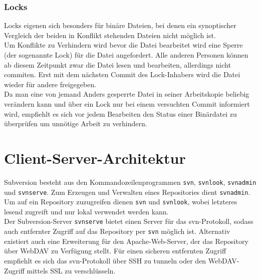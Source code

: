 \subsubsection{Locks}
Locks eigenen sich besonders für binäre Dateien, bei denen ein synoptischer Vergleich der beiden in Konflikt stehenden Dateien nicht möglich ist.\\
Um Konflikte zu Verhindern wird bevor die Datei bearbeitet wird eine Sperre (der sogenannte Lock) für die Datei angefordert. Alle anderen Personen können ab diesem Zeitpunkt zwar die Datei lesen und bearbeiten, allerdings nicht commiten. Erst mit dem nächsten Commit des Lock-Inhabers wird die Datei wieder für andere freigegeben.\\
Da man eine von jemand Anders gesperrte Datei in seiner Arbeitskopie beliebig verändern kann und über ein Lock nur bei einem versuchten Commit informiert wird, empfiehlt es sich vor jedem Bearbeiten den Status einer Binärdatei zu überprüfen um unnötige Arbeit zu verhindern.

\section{Client-Server-Architektur}
Subversion besteht aus den Kommandozeilenprogrammen \texttt{svn}, \texttt{svnlook}, \texttt{svnadmin} und \texttt{svnserve}. Zum Erzeugen und Verwalten eines Repositories dient \texttt{svnadmin}. Um auf ein Repository zuzugreifen dienen \texttt{svn} und \texttt{svnlook}, wobei letzteres lesend zugreift und nur lokal verwendet werden kann.\\
Der Subversion-Server \texttt{svnserve} bietet einen Server für das svn-Protokoll, sodass auch entfernter Zugriff auf das Repository per \texttt{svn} möglich ist. Alternativ existiert auch eine Erweiterung für den Apache-Web-Server, der das Repository über WebDAV zu Verfügung stellt. Für einen sicheren entfernten Zugriff empfiehlt es sich das svn-Protokoll über SSH zu tunneln oder den WebDAV-Zugriff mittels SSL zu verschlüsseln.
